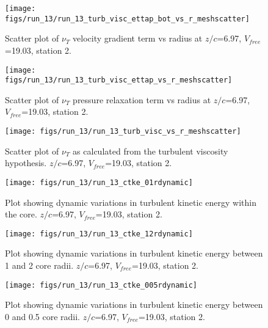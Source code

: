 \begin{figure}[H]
\centering
\texttt{[image: figs/run\_13/run\_13\_turb\_visc\_ettap\_bot\_vs\_r\_meshscatter]}
\caption{Scatter plot of $\nu_T$ velocity gradient term vs radius at $z/c$=6.97, $V_{free}$=19.03, station 2.}
\end{figure}


\begin{figure}[H]
\centering
\texttt{[image: figs/run\_13/run\_13\_turb\_visc\_ettap\_vs\_r\_meshscatter]}
\caption{Scatter plot of $\nu_T$ pressure relaxation term vs radius at $z/c$=6.97, $V_{free}$=19.03, station 2.}
\end{figure}


\begin{figure}[H]
\centering
\texttt{[image: figs/run\_13/run\_13\_turb\_visc\_vs\_r\_meshscatter]}
\caption{Scatter plot of $\nu_T$ as calculated from the turbulent viscosity hypothesis. $z/c$=6.97, $V_{free}$=19.03, station 2.}
\end{figure}


\begin{figure}[H]
\centering
\texttt{[image: figs/run\_13/run\_13\_ctke\_01rdynamic]}
\caption{Plot showing dynamic variations in turbulent kinetic energy within the core. $z/c$=6.97, $V_{free}$=19.03, station 2.}
\end{figure}


\begin{figure}[H]
\centering
\texttt{[image: figs/run\_13/run\_13\_ctke\_12rdynamic]}
\caption{Plot showing dynamic variations in turbulent kinetic energy between 1 and 2 core radii. $z/c$=6.97, $V_{free}$=19.03, station 2.}
\end{figure}


\begin{figure}[H]
\centering
\texttt{[image: figs/run\_13/run\_13\_ctke\_005rdynamic]}
\caption{Plot showing dynamic variations in turbulent kinetic energy between 0 and 0.5 core radii. $z/c$=6.97, $V_{free}$=19.03, station 2.}
\end{figure}


